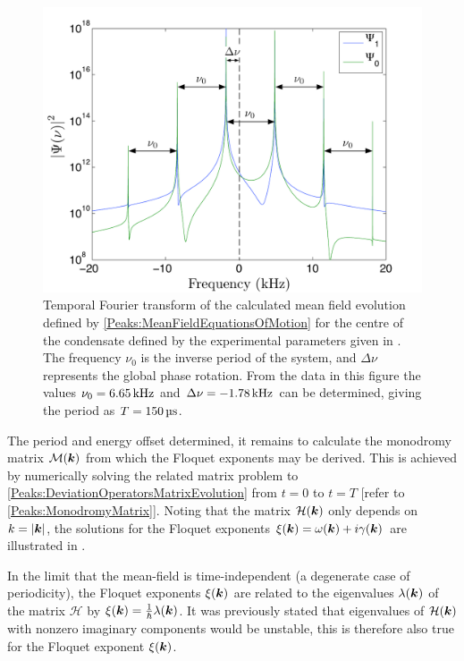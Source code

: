 \begin{figure}
    \centering
    \includegraphics[width=14cm]{MeanFieldFourierTransform}
    \caption{Temporal Fourier transform of the calculated mean field evolution defined by \eqref{Peaks:MeanFieldEquationsOfMotion} for the centre of the condensate defined by the experimental parameters given in . The frequency $\nu_0$ is the inverse period of the system, and $\Delta\nu$ represents the global phase rotation. From the data in this figure the values $\nu_0 = \unit[6.65]{kHz}$ and $\Delta\nu = \unit[-1.78]{kHz}$ can be determined, giving the period as $T=\unit[150]{\micro{}s}$. \label{Peaks:MeanFieldFourierTransform}}
\end{figure}

The period and energy offset determined, it remains to calculate the mono\-dromy matrix $\mathcal{M}(\bm{k})$ from which the Floquet exponents may be derived. This is achieved by numerically solving the related matrix problem to \eqref{Peaks:DeviationOperatorsMatrixEvolution} from $t=0$ to $t=T$ [refer to \eqref{Peaks:MonodromyMatrix}]. Noting that the matrix $\mathcal{H}(\bm{k})$ only depends on $k = \left|\bm{k}\right|$, the solutions for the Floquet exponents $\xi(\bm{k}) = \omega(\bm{k}) + i\gamma(\bm{k})$ are illustrated in .

In the limit that the mean-field is time-independent (a degenerate case of periodicity), the Floquet exponents $\xi(\bm{k})$ are related to the eigenvalues $\lambda(\bm{k})$ of the matrix $\mathcal{H}$ by $\xi(\bm{k}) = \frac{1}{\hbar} \lambda(\bm{k})$. It was previously stated that eigenvalues of $\mathcal{H}(\bm{k})$ with nonzero imaginary components would be unstable, this is therefore also true for the Floquet exponent $\xi(\bm{k})$.

